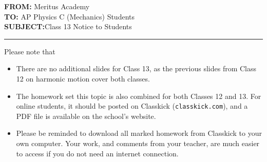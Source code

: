 \documentclass[letterpaper,11pt]{article}
\begin{document}
{\large
  \textbf{FROM:}\tabto{1.3in} Meritus Academy\\
  \textbf{TO:}\tabto{1.3in} AP Physics C (Mechanics) Students\\
  \textbf{SUBJECT:}\tabto{1.3in}Class 13 Notice to Students
}

\vspace{.2in}\hrule

Please note that

\begin{itemize}[itemsep=4pt,topsep=0pt,leftmargin=15pt]
\item There are no additional slides for Class 13, as the previous slides from
  Class 12 on harmonic motion cover both classes.

\item The homework set this topic is also combined for both Classes 12 and 13.
  For online students, it should be posted on Classkick
  (\texttt{classkick.com}), and a PDF file is available on the school's website.

\item Please be reminded to download all marked homework from Classkick to your
  own computer. Your work, and comments from your teacher, are much easier to
  access if you do not need an internet connection.
\end{itemize}
\end{document}
